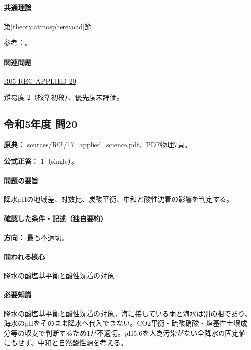 \paragraph{共通理論} \hyperref[theory:atmosphere:acid]{第\ref*{theory:atmosphere:acid}節}

\par 参考：\cite{atm_jma_acid,atm_jma_acid2014}。

\paragraph{関連問題} \hyperref[q:r05-reg-applied-20]{R05-REG-APPLIED-20}

\par 難易度 2（校準初稿）、優先度未評価。

\subsection{令和5年度 問20}
\label{q:r05-reg-applied-20}

\noindent\textbf{原典：} sources/R05/17\_applied\_science.pdf、PDF物理7頁。

\textbf{公式正答：} 1（single）。

\paragraph{問題の要旨} 降水pHの地域差、対数比、炭酸平衡、中和と酸性沈着の影響を判定する。

\paragraph{確認した条件・記述（独自要約）}\mbox{}\par

\noindent\textbf{方向：} 最も不適切。\par

\paragraph{問われる核心} 降水の酸塩基平衡と酸性沈着の対象

\paragraph{必要知識} 降水の酸塩基平衡と酸性沈着の対象。海に接している雨と海水は別の相であり、海水のpHをそのまま降水へ代入できない。CO2平衡・硫酸硝酸・塩基性土壌成分等の収支で判断するため1が不適切。pH5.6を人為汚染がない全降水の固定値にもせず、中和と自然酸性源を考える。

